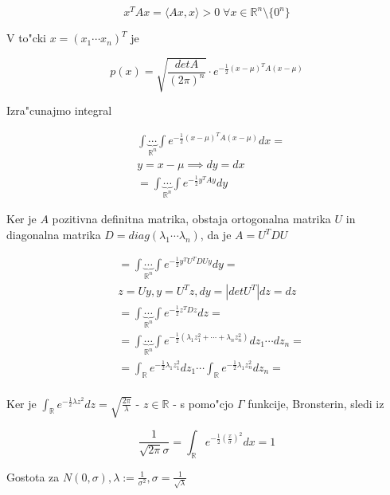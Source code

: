 \documentclass[a4paper,12pt]{article}
\theoremstyle{definition}
\theoremstyle{remark}
\newcommand{\R}{\mathbb{R}}
\begin{document}
\begin{equation*}
    x^T A x = \langle Ax, x \rangle > 0 \; \forall x \in \R^n \text{\textbackslash} \{0^n\}
\end{equation*}

V to"cki $x = (x_1 \cdots x_n)^T$ je

\begin{equation*}
    p(x) = \sqrt{\frac{detA}{(2\pi)^n}} \cdot e^{-\frac{1}{2} (x-\mu)^T A (x-\mu)}
\end{equation*}

Izra"cunajmo integral

\begin{align*}
    &\int \underbrace{\cdots}_{\R^n} \int e^{-\frac{1}{2} (x-\mu)^T A (x-\mu)} dx = \\
    &y = x - \mu \implies dy = dx \\
    &= \int \underbrace{\cdots}_{\R^n} \int e^{-\frac{1}{2} y^T A y} dy
\end{align*}

Ker je $A$ pozitivna definitna matrika, obstaja ortogonalna matrika $U$ in diagonalna matrika
$D = diag(\lambda_1 \cdots \lambda_n)$, da je $A = U^T D U$

\begin{align*}
    &= \int \underbrace{\cdots}_{\R^n} \int e^{-\frac{1}{2} y^T U^T D U y} dy = \\
    &z = U y, y = U^T z, dy = |det U^T| dz = dz \\
    &= \int \underbrace{\cdots}_{\R^n} \int e^{-\frac{1}{2} z^T D z} dz = \\
    &= \int \underbrace{\cdots}_{\R^n} \int e^{-\frac{1}{2} (\lambda_1 z_1^2 + \cdots + \lambda_n z_n^2)}
        dz_1 \cdots dz_n = \\
    &= \int_{\R} e^{-\frac{1}{2} \lambda_1 z_1^2} dz_1 \cdots \int_{\R} e^{-\frac{1}{2} \lambda_1 z_n^2} dz_n = \\
\end{align*}

Ker je $\int_{\R} e^{-\frac{1}{2} \lambda z^2} dz = \sqrt{\frac{2\pi}{\lambda}}$ - $z \in \R$ - s pomo"cjo
$\Gamma$ funkcije, Bronsterin, sledi iz

\begin{equation*}
    \frac{1}{\sqrt{2\pi}\sigma} = \int_{\R} e^{-\frac{1}{2} (\frac{x}{\sigma})^2} dx = 1
\end{equation*}

Gostota za $N(0, \sigma), \lambda := \frac{1}{\sigma^2}, \sigma = \frac{1}{\sqrt{\lambda}}$
\end{document}
